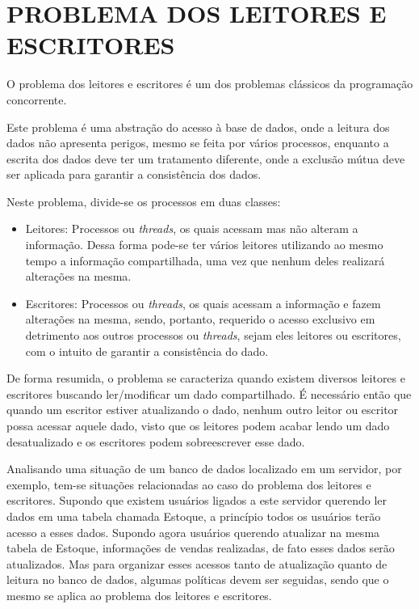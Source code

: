 \section{\normalsize PROBLEMA DOS LEITORES E ESCRITORES}
	O problema dos leitores e escritores é um dos problemas clássicos da programação concorrente. 
	
	Este problema é uma abstração do acesso à base de dados, onde a leitura dos dados não apresenta perigos, mesmo se feita por vários processos, enquanto a escrita dos dados deve ter um tratamento diferente, onde a exclusão mútua deve ser aplicada para garantir a consistência dos dados.
	
	Neste problema, divide-se os processos em duas classes:
	\begin{itemize}
		\item Leitores: Processos ou \textit{threads}, os quais acessam mas não alteram a informação. Dessa forma pode-se ter vários leitores utilizando ao mesmo tempo a informação compartilhada, uma vez que nenhum deles realizará alterações na mesma.
		
		\item Escritores: Processos ou \textit{threads}, os quais acessam a informação e fazem alterações na mesma, sendo, portanto, requerido o acesso exclusivo em detrimento aos outros processos ou \textit{threads}, sejam eles leitores ou escritores, com o intuito de garantir a consistência do dado.
	\end{itemize}
	
	De forma resumida, o problema se caracteriza quando existem diversos leitores e escritores buscando ler/modificar um dado compartilhado. É necessário então que quando um escritor estiver atualizando o dado, nenhum outro leitor ou escritor possa acessar aquele dado, visto que os leitores podem acabar lendo um dado desatualizado e os escritores podem sobreescrever esse dado.
	
	Analisando uma situação de um banco de dados localizado em um servidor, por exemplo, tem-se situações relacionadas ao caso do problema dos leitores e escritores. Supondo que existem usuários ligados a este servidor querendo ler dados em uma tabela chamada Estoque, a princípio todos os usuários terão acesso a esses dados. Supondo agora usuários querendo atualizar na mesma tabela de Estoque, informações de vendas realizadas, de fato esses dados serão atualizados. Mas para organizar esses acessos tanto de atualização quanto de leitura no banco de dados, algumas políticas devem ser seguidas, sendo que o mesmo se aplica ao problema dos leitores e escritores.
	
